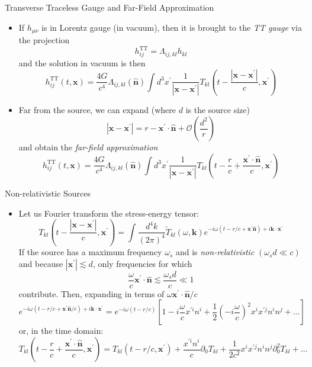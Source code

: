 \documentclass[size=11pt,style=paintings]{powerdot}
\begin{document}
\begin{slide}{Transverse Traceless Gauge and Far-Field Approximation}
 \begin{itemize} 
 \item If $h_{\mu\nu}$ is in Lorentz gauge (in vacuum), then it is brought to the \textit{TT gauge} via the projection
$$
h_{i j}^{\mathrm{TT}}=\Lambda_{i j, k l} h_{k l}
$$
and the solution in vacuum is then 
$$
h_{i j}^{\mathrm{TT}}(t, \mathbf{x})=\frac{4 G}{c^{4}} \Lambda_{i j, k l}(\hat{\mathbf{n}}) \int d^{3} x^{\prime} \frac{1}{\left|\mathbf{x}-\mathbf{x}^{\prime}\right|} T_{k l}\left(t-\frac{\left|\mathbf{x}-\mathbf{x}^{\prime}\right|}{c}, \mathbf{x}^{\prime}\right)
$$
\item Far from the source, we can expand (where $d$ is the source size)
$$
\left|\mathbf{x}-\mathbf{x}^{\prime}\right|=r-\mathbf{x}^{\prime} \cdot \hat{\mathbf{n}}+\mathcal{O}\left(\frac{d^{2}}{r}\right)
$$
and obtain the \textit{far-field approximation
}$$
h_{i j}^{\mathrm{TT}}(t, \mathbf{x})=\frac{4 G}{c^{4}} \Lambda_{i j, k l}(\hat{\mathbf{n}}) \int d^{3} x^{\prime} \frac{1}{\left|\mathbf{x}-\mathbf{x}^{\prime}\right|} T_{k l}\left(t-\frac{r}{c}+\frac{\mathbf{x}^{\prime} \cdot \hat{\mathbf{n}}}{c}, \mathbf{x}^{\prime}\right)
$$
 \end{itemize}
 \end{slide}


\begin{slide}{Non-relativistic Sources}
 \begin{itemize}
 \item Let us Fourier transform the stress-energy tensor:
 $$
T_{k l}\left(t-\frac{\left|\mathbf{x}-\mathbf{x}^{\prime}\right|}{c}, \mathbf{x}^{\prime}\right)=\int \frac{d^{4} k}{(2 \pi)^{4}} \tilde{T}_{k l}(\omega, \mathbf{k}) e^{-i \omega\left(t-r / c+\mathbf{x}^{\prime} \hat{\mathbf{n}}\right)+i \mathbf{k} \cdot \mathbf{x}^{\prime}}
$$
 If the source has a maximum frequency $\omega_{s}$ and is \textit{non-relativistic} $(\omega_{s} d \ll c)$ and because $ \left|\mathbf{x}^{\prime}\right| \lesssim d$, only frequencies for which 
$$
\frac{\omega}{c} \mathbf{x}^{\prime} \cdot \hat{\mathbf{n}} \lesssim \frac{\omega_{s} d}{c} \ll 1
$$
contribute. Then, expanding in terms of $ \omega \mathbf{x}^{\prime} \cdot \hat{\mathbf{n}} / c$
$$
e^{-i \omega\left(t-r / c+\mathbf{x}^{\prime} \hat{\mathbf{n}} / c\right)+i \mathbf{k} \cdot \mathbf{x}^{\prime}}=e^{-i \omega(t-r / c)}\left[1-i \frac{\omega}{c} x^{\prime i} n^{i}+\frac{1}{2}\left(-i \frac{\omega}{c}\right)^{2} x^{i} x^{\prime j} n^{i} n^{j}+\ldots\right]
$$
or, in the time domain:
$$
T_{k l}\left(t-\frac{r}{c}+\frac{\mathbf{x}^{\prime} \cdot \hat{\mathbf{n}}}{c}, \mathbf{x}^{\prime}\right)=T_{k l}\left(t-r / c, \mathbf{x}^{\prime}\right)+\frac{x^{\prime i} n^{i}}{c} \partial_{0} T_{k l}+\frac{1}{2 c^{2}} x^{i} x^{\prime j} n^{i} n^{j} \partial_{0}^{2} T_{k l}+\dots
$$
 \end{itemize}
 \end{slide}
\end{document}
